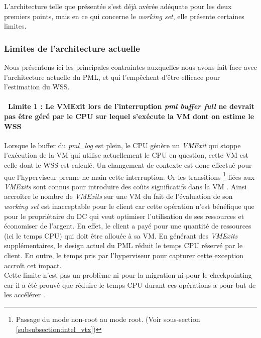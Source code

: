 \noindent L'architecture telle que présentée s'est déjà avérée adéquate pour les deux premiers points, mais en ce qui concerne le \textit{working set}, elle présente certaines limites.

\subsubsection{Limites de l'architecture actuelle}
\label{subsubsection:limites_pml_actuel}
Nous présentons ici les principales contraintes auxquelles nous avons fait face avec l'architecture actuelle du PML, et qui l'empêchent d'être efficace pour l'estimation du WSS.

\paragraph{\textbullet\ \textbf{Limite 1 : Le VMExit lors de l'interruption \textit{pml buffer full} ne devrait pas être géré par le CPU sur lequel s'exécute la VM dont on estime le WSS}}
\par\noindent
\par\noindent Lorsque le buffer du \textit{pml\_log} est plein, le CPU génère un \textit{VMExit} qui stoppe l'exécution de la VM qui utilise actuellement le CPU en question, cette VM est celle dont le WSS est calculé. Un changement de contexte est donc effectué pour que l'hyperviseur prenne ne main cette interruption. Or les transitions \footnote{Passage du mode non-root au mode root. (Voir sous-section \ref{subsubsection:intel_vtx})} liées aux \textit{VMExits} sont connus pour introduire des coûts significatifs dans la VM \cite{overhead_VMExit}. Ainsi accroître le nombre de \textit{VMExits} sur une VM du fait de l'évaluation de son \textit{working set} est inacceptable pour le client car cette opération n'est bénéfique que pour le propriétaire du DC qui veut optimiser l'utilisation de ses ressources et économiser de l'argent. En effet, le client a payé pour une quantité de ressources (ici le temps CPU) qui doit être allouée à sa VM. En générant des \textit{VMExits} supplémentaires, le design actuel du PML réduit le temps CPU réservé par le client. En outre, le temps pris par l'hyperviseur pour capturer cette exception accroît cet impact.\\
Cette limite n'est pas un problème ni pour la migration ni pour le checkpointing car il a été prouvé que réduire le temps CPU durant ces opérations a pour but de les accélérer \cite{cpu_time_migration}.

